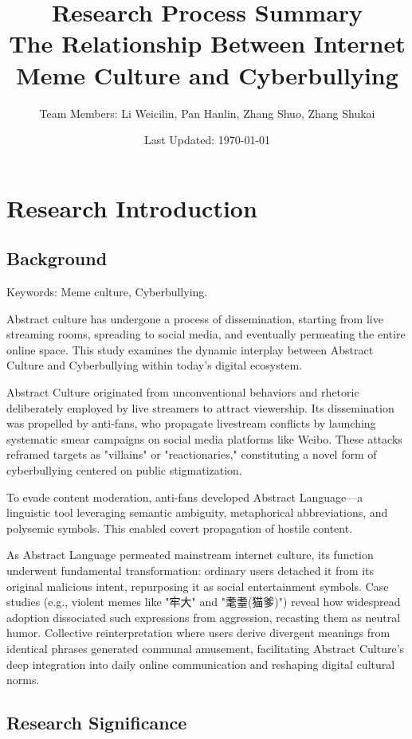 \documentclass[12pt,a4paper]{ctexart}
\title{
    {\Large Research Process Summary}\\
    {\large The Relationship Between Internet Meme Culture and Cyberbullying}
}
\author{
    {\small Team Members: Li Weicilin, Pan Hanlin, Zhang Shuo, Zhang Shukai}\\
}
\date{Last Updated: \today}
\theoremstyle{MyLineTheoremStyle}
\theoremstyle{MyBlockTheoremStyle}
\theoremstyle{MySubsubsectionStyle}
\begin{document}
\maketitle
\tableofcontents
\newpage

\section{Research Introduction}
\subsection{Background}

Keywords: Meme culture, Cyberbullying.

Abstract culture has undergone a process of dissemination, starting from live streaming rooms, spreading to social media, and eventually permeating the entire online space. This study examines the dynamic interplay between Abstract Culture and Cyberbullying within today's digital ecosystem.

Abstract Culture originated from unconventional behaviors and rhetoric deliberately employed by live streamers to attract viewership. Its dissemination was propelled by anti-fans, who propagate livestream conflicts by launching systematic smear campaigns on social media platforms like Weibo. These attacks reframed targets as "villains" or "reactionaries," constituting a novel form of cyberbullying centered on public stigmatization.

To evade content moderation, anti-fans developed Abstract Language—a linguistic tool leveraging semantic ambiguity, metaphorical abbreviations, and polysemic symbols. This enabled covert propagation of hostile content.

As Abstract Language permeated mainstream internet culture, its function underwent fundamental transformation: ordinary users detached it from its original malicious intent, repurposing it as social entertainment symbols. Case studies (e.g., violent memes like "牢大" and "耄耋(猫爹)") reveal how widespread adoption dissociated such expressions from aggression, recasting them as neutral humor. Collective reinterpretation where users derive divergent meanings from identical phrases generated communal amusement, facilitating Abstract Culture's deep integration into daily online communication and reshaping digital cultural norms.

\subsection{Research Significance}
\end{document}
